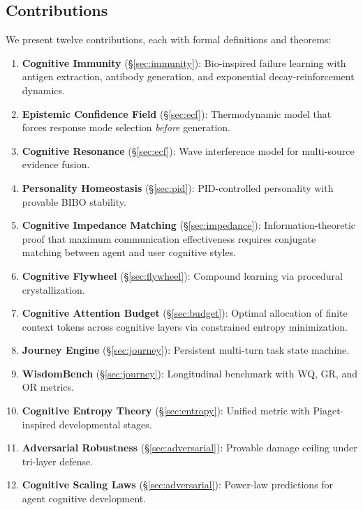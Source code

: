 \documentclass[11pt,a4paper]{article}
\begin{document}
\subsection{Contributions}

We present twelve contributions, each with formal definitions and theorems:

\begin{enumerate}[nosep]
  \item \textbf{Cognitive Immunity} (\S\ref{sec:immunity}): Bio-inspired
    failure learning with antigen extraction, antibody generation, and
    exponential decay-reinforcement dynamics.
  \item \textbf{Epistemic Confidence Field} (\S\ref{sec:ecf}): Thermodynamic
    model that forces response mode selection \emph{before} generation.
  \item \textbf{Cognitive Resonance} (\S\ref{sec:ecf}): Wave interference
    model for multi-source evidence fusion.
  \item \textbf{Personality Homeostasis} (\S\ref{sec:pid}): PID-controlled
    personality with provable BIBO stability.
  \item \textbf{Cognitive Impedance Matching} (\S\ref{sec:impedance}):
    Information-theoretic proof that maximum communication effectiveness
    requires conjugate matching between agent and user cognitive styles.
  \item \textbf{Cognitive Flywheel} (\S\ref{sec:flywheel}): Compound learning
    via procedural crystallization.
  \item \textbf{Cognitive Attention Budget} (\S\ref{sec:budget}):
    Optimal allocation of finite context tokens across cognitive layers
    via constrained entropy minimization.
  \item \textbf{Journey Engine} (\S\ref{sec:journey}): Persistent multi-turn
    task state machine.
  \item \textbf{WisdomBench} (\S\ref{sec:journey}): Longitudinal benchmark
    with WQ, GR, and OR metrics.
  \item \textbf{Cognitive Entropy Theory} (\S\ref{sec:entropy}): Unified
    metric with Piaget-inspired developmental stages.
  \item \textbf{Adversarial Robustness} (\S\ref{sec:adversarial}): Provable
    damage ceiling under tri-layer defense.
  \item \textbf{Cognitive Scaling Laws} (\S\ref{sec:adversarial}): Power-law
    predictions for agent cognitive development.
\end{enumerate}
\end{document}
